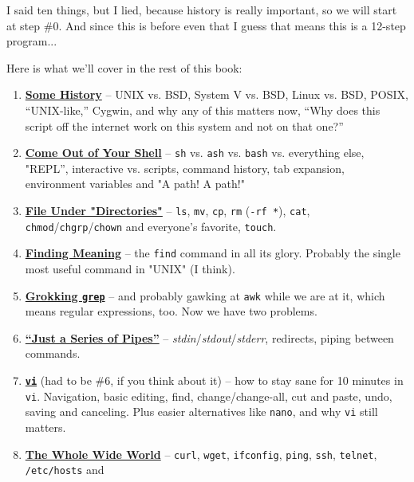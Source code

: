 \documentclass[10pt,american,]{book}
\numberwithin{figure}{chapter}
\begin{document}
I said ten things, but I lied, because history is really important, so
we will start at step \#0. And since this is before even that I guess
that means this is a 12-step program...

Here is what we'll cover in the rest of this book:

\begin{enumerate}
\def\labelenumi{\arabic{enumi}.}
\setcounter{enumi}{-1}
\item
  \protect\hyperlink{some-history}{\textbf{Some History}} – UNIX vs.
  BSD, System V vs. BSD, Linux vs. BSD, POSIX, “UNIX-like,” Cygwin, and
  why any of this matters now, “Why does this script off the internet
  work on this system and not on that one?”
\item
  \protect\hyperlink{come-out-of-your-shell}{\textbf{Come Out of Your
  Shell}} – \texttt{sh} vs. \texttt{ash} vs. \texttt{bash} vs.
  everything else, "REPL”, interactive vs. scripts, command history, tab
  expansion, environment variables and "A path! A path!"
\item
  \protect\hyperlink{file-under-directories}{\textbf{File Under
  "Directories"}} – \texttt{ls}, \texttt{mv}, \texttt{cp}, \texttt{rm}
  (\texttt{-rf\ *}), \texttt{cat},
  \texttt{chmod}/\texttt{chgrp}/\texttt{chown} and everyone's favorite,
  \texttt{touch}.
\item
  \protect\hyperlink{finding-meaning}{\textbf{Finding Meaning}} – the
  \texttt{find} command in all its glory. Probably the single most
  useful command in "UNIX" (I think).
\item
  \protect\hyperlink{grokking-grep}{\textbf{Grokking \texttt{grep}}} –
  and probably gawking at \texttt{awk} while we are at it, which means
  regular expressions, too. Now we have two problems.
\item
  \protect\hyperlink{just-a-series-of-pipes}{\textbf{“Just a Series of
  Pipes”}} – \emph{stdin}/\emph{stdout}/\emph{stderr}, redirects, piping
  between commands.
\item
  \protect\hyperlink{vi}{\textbf{\texttt{vi}}} (had to be \#6, if you
  think about it) – how to stay sane for 10 minutes in \texttt{vi}.
  Navigation, basic editing, find, change/change-all, cut and paste,
  undo, saving and canceling. Plus easier alternatives like
  \texttt{nano}, and why \texttt{vi} still matters.
\item
  \protect\hyperlink{the-whole-wide-world}{\textbf{The Whole Wide
  World}} – \texttt{curl}, \texttt{wget}, \texttt{ifconfig},
  \texttt{ping}, \texttt{ssh}, \texttt{telnet}, \texttt{/etc/hosts} and

\end{enumerate}
\end{document}
